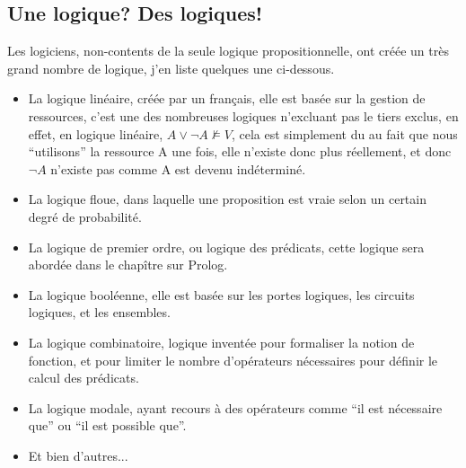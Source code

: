 \documentclass[a4paper, 12pt]{article}
\numberwithin{equation}{subsection}
\begin{document}
\subsection{Une logique? Des logiques!}
Les logiciens, non-contents de la seule logique propositionnelle, ont créée un très grand nombre de logique, j'en liste quelques une ci-dessous.
\begin{itemize}
  \item La logique linéaire, créée par un français, elle est basée sur la gestion de ressources, c'est une des nombreuses logiques n'excluant pas le tiers exclus, en effet, en logique linéaire, $A \lor \neg A \nvDash V$, cela est simplement du au fait que nous ``utilisons'' la ressource A une fois, elle n'existe donc plus réellement, et donc $\neg A$ n'existe pas comme A est devenu indéterminé.
  \item La logique floue, dans laquelle une proposition est vraie selon un certain degré de probabilité.
  \item La logique de premier ordre, ou logique des prédicats, cette logique sera abordée dans le chapître sur Prolog.
  \item La logique booléenne, elle est basée sur les portes logiques, les circuits logiques, et les ensembles.
  \item La logique combinatoire, logique inventée pour formaliser la notion de fonction, et pour limiter le nombre d'opérateurs nécessaires pour définir le calcul des prédicats.
  \item La logique modale, ayant recours à des opérateurs comme ``il est nécessaire que'' ou ``il est possible que''.
  \item Et bien d'autres...
\end{itemize}
\vfill
\end{document}
